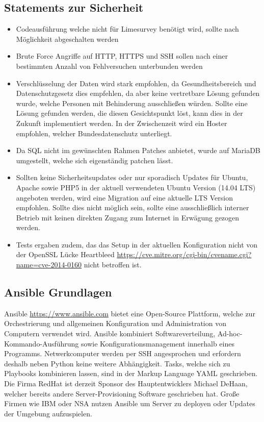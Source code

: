 \subsection{Statements zur Sicherheit}
\begin{itemize}
  \item Codeausführung welche nicht für Limesurvey benötigt wird, sollte nach Möglichkeit abgeschalten werden
  \item Brute Force Angriffe auf HTTP, HTTPS und SSH sollen nach einer bestimmten Anzahl von Fehlversuchen unterbunden werden
  \item Verschlüsselung der Daten wird stark empfohlen, da Gesundheitsbereich und Datenschutzgesetz dies empfehlen, da aber keine vertretbare Lösung gefunden wurde, welche Personen mit Behinderung ausschließen würden. Sollte eine Lösung gefunden werden, die diesen Gesichtspunkt löst, kann dies in der Zukunft implementiert werden. In der Zwischenzeit wird ein Hoster empfohlen, welcher Bundesdatenschutz unterliegt.
  \item Da SQL nicht im gewünschten Rahmen Patches anbietet, wurde auf MariaDB umgestellt, welche sich eigenständig patchen lässt.
  \item Sollten keine Sicherheitsupdates oder nur sporadisch Updates für Ubuntu, Apache sowie PHP5 in der aktuell verwendeten Ubuntu Version (14.04 LTS) angeboten werden, wird eine Migration auf eine aktuelle LTS Version empfohlen. Sollte dies nicht möglich sein, sollte eine ausschließlich interner Betrieb mit keinen direkten Zugang zum Internet in Erwägung gezogen werden.
  \item Tests ergaben zudem, das das Setup in der aktuellen Konfiguration nicht von der OpenSSL Lücke Heartbleed \url{https://cve.mitre.org/cgi-bin/cvename.cgi?name=cve-2014-0160} nicht betroffen ist.
\end{itemize}



\newpage
\subsection{Ansible Grundlagen}
Ansible \url{https://www.ansible.com} bietet eine Open-Source Plattform, welche zur Orchestrierung und allgemeinen Konfiguration und Administration von Computern verwendet wird. Ansible kombiniert Softwareverteilung, Ad-hoc-Kommando-Ausführung sowie Konfigurationsmanagement innerhalb eines Programms.
Netwerkcomputer werden per SSH angesprochen und erfordern deshalb neben Python keine weitere Abhängigkeit.
Tasks, welche sich zu Playbooks kombinieren lassen, sind in der Markup Language YAML geschrieben.
Die Firma RedHat ist derzeit Sponsor des Hauptentwicklers Michael DeHaan, welcher bereits andere Server-Provisioning Software geschrieben hat.
Große Firmen wie IBM oder NSA nutzen Ansible um Server zu deployen oder Updates der Umgebung aufzuspielen.
